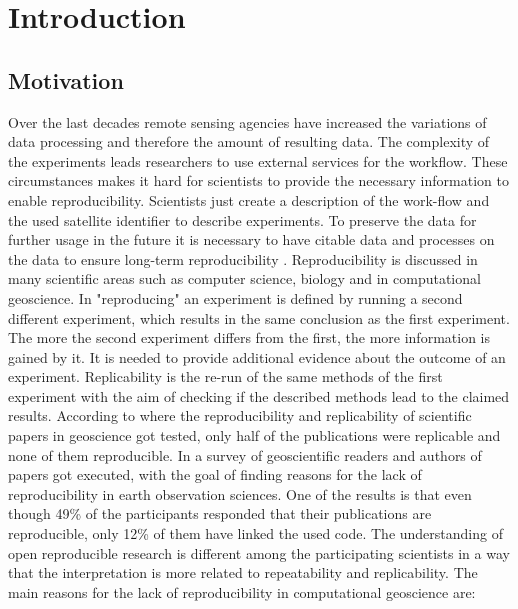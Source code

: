 \documentclass[draft,final]{vutinfth} %
\begin{document}

\tableofcontents %

\mainmatter

\chapter{Introduction}\label{Introduction}
\section{Motivation}\label{Motivation}
Over the last decades remote sensing agencies have increased the variations of data processing and therefore the amount of resulting data. The complexity of the experiments leads researchers to use external services for the workflow. These circumstances makes it hard for scientists to provide the necessary information to enable reproducibility. Scientists just create a description of the work-flow and the used satellite identifier to describe experiments. To preserve the data for further usage in the future it is necessary to have citable data and processes on the data to ensure long-term reproducibility \cite{6352411}. Reproducibility is discussed in many scientific areas such as computer science, biology and in computational geoscience. In \cite{reprovsrepli} "reproducing" an experiment is defined by running a second different experiment, which results in the same conclusion as the first experiment. The more the second experiment differs from the first, the more information is gained by it. It is needed to provide additional evidence about the outcome of an experiment. Replicability is the re-run of the same methods of the first experiment with the aim of checking if the described methods lead to the claimed results\cite{reprovsrepli}. According to \cite{Ostermann2017AdvancingSW} where the reproducibility and replicability of scientific papers in geoscience got tested, only half of the publications were replicable and none of them reproducible. In \cite{Thestateofreproducibility} a survey of geoscientific readers and authors of papers got executed, with the goal of finding reasons for the lack of reproducibility in earth observation sciences. One of the results is that even though 49\% of the participants responded that their publications are reproducible, only 12\% of them have linked the used code. The understanding of open reproducible research is different among the participating scientists in a way that the interpretation is more related to repeatability and replicability. The main reasons for the lack of reproducibility in computational geoscience are:
\end{document}
